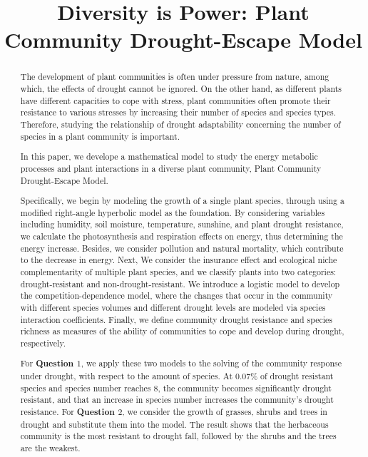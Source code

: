 \documentclass[12pt]{article}  %
\title{Diversity is Power: Plant Community Drought-Escape Model}  %
\begin{document}
\begin{abstract}

The development of plant communities is often under pressure from nature, among which, the effects of drought cannot be ignored. On the other hand, as different plants have different capacities to cope with stress, plant communities often promote their resistance to various stresses by increasing their number of species and species types. Therefore, studying the relationship of drought adaptability concerning the number of species in a plant community  is important.

In this paper, we develope a mathematical model to study the energy metabolic processes and plant interactions in a diverse plant community, Plant Community Drought-Escape Model. 

Specifically, we begin by modeling the growth of a single plant species, through using a modified right-angle hyperbolic model as the foundation. By considering variables including humidity, soil moisture, temperature, sunshine, and plant drought resistance, we calculate the photosynthesis and respiration effects on energy, thus determining the energy increase. Besides, we consider pollution and natural mortality, which contribute to the decrease in energy. Next, We consider the insurance effect and ecological niche complementarity of multiple plant species, and we classify plants into two categories: drought-resistant and non-drought-resistant. We introduce a logistic model to develop the competition-dependence model, where the changes that occur in the community with different species volumes and different drought levels are modeled via species interaction coefficients. Finally, we define community drought resistance and species richness as measures of the ability of communities to cope and develop during drought, respectively.

For \textbf{Question $1$}, we apply these two models to the solving of the community response under drought, with respect to the amount of species. At $0.07\%$ of drought resistant species and species number reaches $8$, the community becomes significantly drought resistant, and that an increase in species number increases the community's drought resistance. For \textbf{Question $2$}, we consider the growth of grasses, shrubs and trees in drought and substitute them into the model. The result shows that the herbaceous community is the most resistant to drought fall, followed by the shrubs and the trees are the weakest.


\end{abstract}
\end{document}
